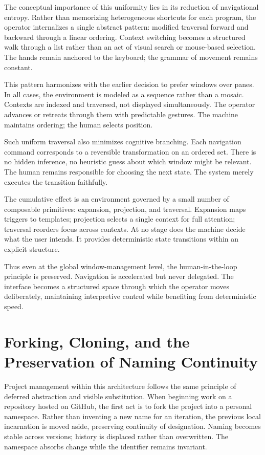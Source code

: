 \documentclass[11pt]{article}
\begin{document}
The conceptual importance of this uniformity lies in its reduction of navigational entropy. Rather than memorizing heterogeneous shortcuts for each program, the operator internalizes a single abstract pattern: modified traversal forward and backward through a linear ordering. Context switching becomes a structured walk through a list rather than an act of visual search or mouse-based selection. The hands remain anchored to the keyboard; the grammar of movement remains constant.

This pattern harmonizes with the earlier decision to prefer windows over panes. In all cases, the environment is modeled as a sequence rather than a mosaic. Contexts are indexed and traversed, not displayed simultaneously. The operator advances or retreats through them with predictable gestures. The machine maintains ordering; the human selects position.

Such uniform traversal also minimizes cognitive branching. Each navigation command corresponds to a reversible transformation on an ordered set. There is no hidden inference, no heuristic guess about which window might be relevant. The human remains responsible for choosing the next state. The system merely executes the transition faithfully.

The cumulative effect is an environment governed by a small number of composable primitives: expansion, projection, and traversal. Expansion maps triggers to templates; projection selects a single context for full attention; traversal reorders focus across contexts. At no stage does the machine decide what the user intends. It provides deterministic state transitions within an explicit structure.

Thus even at the global window-management level, the human-in-the-loop principle is preserved. Navigation is accelerated but never delegated. The interface becomes a structured space through which the operator moves deliberately, maintaining interpretive control while benefiting from deterministic speed.

\section{Forking, Cloning, and the Preservation of Naming Continuity}

Project management within this architecture follows the same principle of deferred abstraction and visible substitution. When beginning work on a repository hosted on GitHub, the first act is to fork the project into a personal namespace. Rather than inventing a new name for an iteration, the previous local incarnation is moved aside, preserving continuity of designation. Naming becomes stable across versions; history is displaced rather than overwritten. The namespace absorbs change while the identifier remains invariant.
\end{document}
